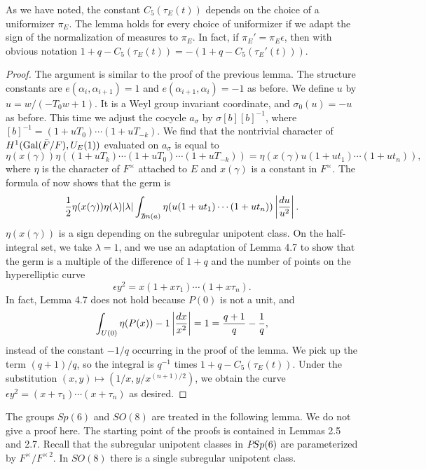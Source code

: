 \documentclass{amsart}
\begin{document}
As we have noted, the constant $C_5(\tau_E(t))$
depends on the choice of a uniformizer $\pi_E$.  The lemma
holds for every choice of uniformizer if we adapt the sign of the 
normalization of measures to $\pi_E$. In fact, if $\pi_E' = \pi_E\epsilon$,
then with obvious notation $1+q-C_5(\tau_E(t)) =
-(1+q-C_5(\tau_E'(t)))$. 

\begin{proof}  The argument is similar to the proof of the
previous lemma.  The structure constants are $e(\alpha_i,\alpha_{i+1})=1$
and $e(\alpha_{i+1},\alpha_i)= -1$ as
before.  We define $u$ by $u=w/(-T_0 w+1)$.  It is a Weyl group
invariant coordinate, and $\sigma_0(u) = -u$ as before.
This time we adjust the cocycle $a_\sigma$ by $\sigma[b][b]^{-1}$,
where $[b]^{-1} = (1+ u T_0)\cdots (1+ u T_{-k})$.  We find that
the nontrivial character of $H^1(\operatorname{Gal}({\bar F}/F),U_E(1))$ evaluated
on $a_\sigma$ is equal to 
$$\eta(x(\gamma))\eta((1+u T_k)\cdots (1+u T_0)\cdots (1+ u T_{-k})) =
\eta(x(\gamma) u (1+u t_1)\cdots (1+u t_n)),$$
where $\eta$ is the character of $F^\times$ attached to $E$
and $x(\gamma)$ is a constant in $F^\times$.  
The formula of \cite{H3,VII.5.5} now shows that the germ is
$${1\over 2}\eta(x(\gamma))\eta(\lambda)|\lambda|\int_{{\mathcal I\hskip-.2em m}(a)}
   \eta(u (1+ u t_1)\cdots (1+u t_n))\left| {du\over u^2}\right|.$$
$\eta(x(\gamma))$ is a sign depending on the subregular unipotent class.
On the half-integral set, we take $\lambda=1$, and we use
an adaptation of Lemma 4.7 to show that the germ is a multiple
of the difference of $1+q$ and
the number of points on the hyperelliptic curve
$$\epsilon y^2 = x (1+ x\tau_1)\cdots (1+x \tau_n).$$
In fact, Lemma 4.7 does not hold because $P(0)$ is not a unit, and
$$\int_{U(0)} \eta(P(x))-1 \left| {dx\over x^2}\right | = 1 = 
{q+1\over q} - {1\over q},$$
instead of the constant $-1/q$ occurring
in the proof of the lemma.  We pick up the term $(q+1)/q$, so the
integral is $q^{-1}$ times $1+q-C_5(\tau_E(t))$.
Under the substitution $(x,y)\mapsto (1/x,y/x^{(n+1)/2})$, we
obtain the curve
$\epsilon y^2 = (x+\tau_1)\cdots (x+\tau_n)$
as desired.\end{proof}

\bigskip
The groups $Sp(6)$ and $SO(8)$ are treated in the following
lemma.  We do not give a proof here.  The starting point
of the proofs is contained in Lemmas 2.5 and 2.7.
Recall that the subregular unipotent classes in ${P\! Sp}(6)$
are parameterized by $F^\times/F^{\times\,2}$.  In $SO(8)$
there is a single subregular unipotent class.
\end{document}
